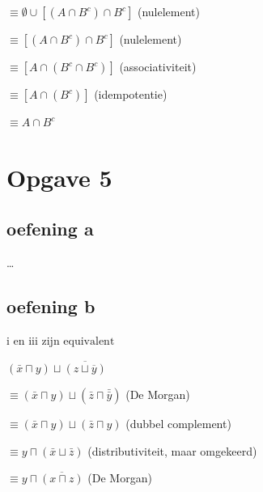 \documentclass[11pt, a4paper]{article}
\begin{document}
$\equiv  \emptyset \cup [(A \cap B^c) \cap {B}^c]$ \hfill (nulelement)

$\equiv  [(A \cap B^c) \cap {B}^c]$ \hfill (nulelement)

$\equiv  [A \cap (B^c \cap {B}^c)]$ \hfill (associativiteit)

$\equiv  [A \cap ({B}^c)]$ \hfill (idempotentie)

$\equiv \boxed{A \cap B^c}$



\section*{Opgave 5}

\subsection*{oefening a}
\ldots


\subsection*{oefening b}

$\boxed{\text{i en iii zijn equivalent}}$

$(\bar{x} \sqcap y) \sqcup \overline{(z \sqcup \overline{y})}$

$\equiv (\bar{x} \sqcap y) \sqcup (\bar{z} \sqcap \bar{\bar{y}})$ \hfill (De Morgan)

$\equiv (\bar{x} \sqcap y) \sqcup (\bar{z} \sqcap y)$ \hfill (dubbel complement)

$\equiv y \sqcap (\bar{x} \sqcup \bar{z})$ \hfill (distributiviteit, maar omgekeerd)

$\equiv y \sqcap \overline{(x \sqcap z)}$ \hfill (De Morgan)
\end{document}
